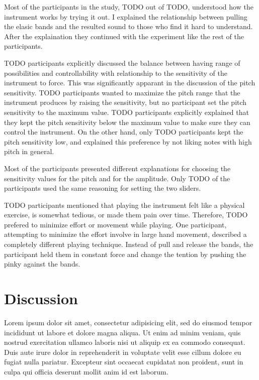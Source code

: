 \documentclass{sigchi}
\begin{document}
Most of the participants in the study, TODO out of TODO, understood how the instrument works by trying it out.
I explained the relationship between pulling the elasic bands and the resulted sound to those who find it hard to understand.
After the explaination they continued with the experiment like the rest of the participants.

TODO participants explicitly discussed the balance between having range of possibilities and controllability with relationship to the sensitivity of the instrument to force.
This was significantly apparant in the discussion of the pitch sensitivity.
TODO participants wanted to maximize the pitch range that the instrument produces by raising the sensitivity, but no participant set the pitch sensitivity to the maximum value.
TODO participants explicitly explained that they kept the pitch sensitivity below the maximum value to make sure they can control the instrument.
On the other hand, only TODO participants kept the pitch sensitivity low, and explained this preference by not liking notes with high pitch in general.

Most of the participants presented different explanations for choosing the sensitivity values for the pitch and for the amplitude.
Only TODO of the participants used the same reasoning for setting the two sliders.

TODO participants mentioned that playing the instrument felt like a physical exercise, is somewhat tedious, or made them pain over time.
Therefore, TODO prefered to minimize effort or movement while playing.
One participant, attempting to minimize the effort involve in large hand movement, described a completely different playing technique.
Instead of pull and release the bands, the participant held them in constant force and change the tention by pushing the pinky against the bands.

\section{Discussion}

Lorem ipsum dolor sit amet, consectetur adipisicing elit, sed do eiusmod tempor incididunt ut labore et dolore magna aliqua. Ut enim ad minim veniam, quis nostrud exercitation ullamco laboris nisi ut aliquip ex ea commodo consequat. Duis aute irure dolor in reprehenderit in voluptate velit esse cillum dolore eu fugiat nulla pariatur. Excepteur sint occaecat cupidatat non proident, sunt in culpa qui officia deserunt mollit anim id est laborum.
\end{document}
